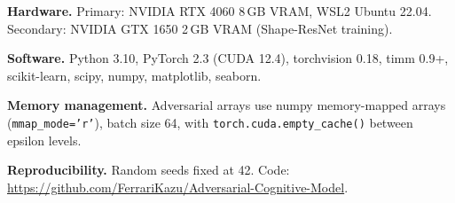 \documentclass[12pt,a4paper]{article}
\begin{document}
\textbf{Hardware.}
Primary: NVIDIA RTX 4060 8\,GB VRAM, WSL2 Ubuntu 22.04.
Secondary: NVIDIA GTX 1650 2\,GB VRAM (Shape-ResNet training).

\textbf{Software.}
Python 3.10, PyTorch 2.3 (CUDA 12.4), torchvision 0.18,
timm 0.9+, scikit-learn, scipy, numpy, matplotlib, seaborn.

\textbf{Memory management.}
Adversarial arrays use numpy memory-mapped arrays
(\texttt{mmap\_mode='r'}), batch size 64,
with \texttt{torch.cuda.empty\_cache()} between epsilon levels.

\textbf{Reproducibility.}
Random seeds fixed at 42. Code:
\url{https://github.com/FerrariKazu/Adversarial-Cognitive-Model}.
\end{document}
